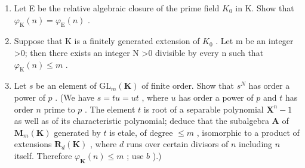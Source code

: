 \begin{enumerate}
\def\labelenumi{\alph{enumi})}
\item
  Let E be the relative algebraic closure of the prime field \(K_{0}\) in K. Show that \(\varphi_{\mathrm{K}}(n) = \varphi_{\mathrm{E}}(n)\) .
\item
  Suppose that K is a finitely generated extension of \(K_{0}\) . Let m be an integer \textgreater0; then there exists an integer N \textgreater0 divisible by every n such that \(\varphi_{\mathrm{K}}(n) \leqslant m\) .
\item
  Let \(s\) be an element of \(\mathrm{GL}_m(\mathbf{K})\) of finite order. Show that \(s^N\) has order a power of \(p\) . (We have \(s = tu = ut\) , where \(u\) has order a power of \(p\) and \(t\) has order \(n\) prime to \(p\) . The element \(t\) is root of a separable polynomial \(\mathbf{X}^n - 1\) as well as of its characteristic polynomial; deduce that the subalgebra \(\mathbf{A}\) of \(\mathbf{M}_m(\mathbf{K})\) generated by \(t\) is etale, of degree \(\leqslant m\) , isomorphic to a product of extensions \(\mathbf{R}_d(\mathbf{K})\) , where \(d\) runs over certain divisors of \(n\) including \(n\) itself. Therefore \(\varphi_{\mathbf{K}}(n) \leqslant m\) ; use \(b\) ).)
\end{enumerate}
